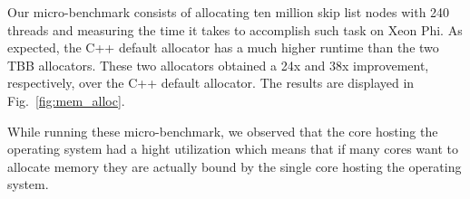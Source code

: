 Our micro-benchmark consists of allocating ten million skip list nodes with 240 threads and measuring the time it takes to accomplish such task on Xeon Phi.
As expected, the C++ default allocator has a much higher runtime than the two TBB allocators. These two allocators obtained a 24x and 38x improvement, respectively, over the C++ default allocator. The results are displayed in Fig.~\ref{fig:mem_alloc}.

While running these micro-benchmark, we observed that the core hosting the operating system had a hight utilization which means that if many cores want to allocate memory they are actually bound by the single core hosting the operating system.
